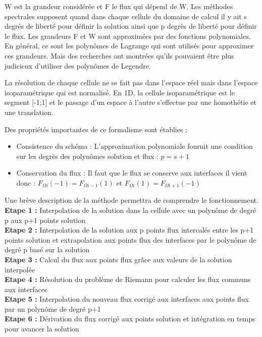 \documentclass[a4paper,12pt]{report}
\theoremstyle{break}
\begin{document}
W est la grandeur considérée et F le flux qui dépend de W. Les méthodes spectrales supposent quand dans chaque cellule du domaine de calcul il y ait s degrés de liberté pour définir la solution ainsi que p degrès de liberté pour définir le flux. Les grandeurs F et W sont approximées par des fonctions polynomiales. En général, ce sont les polynômes de Lagrange qui sont utilisés pour approximer ces grandeurs. Mais des recherches ont montrées qu'ils pouvaient être plus judicieux d'utiliser des polynômes de Legendre. 

La résolution de chaque cellule ne se fait pas dans l'espace réel mais dans l'espace isoparamétrique qui est normalisé. En 1D, la cellule isoparamétrique est le segment [-1;1] et le passage d'un espace à l'autre s'effectue par une homothétie et une translation. 

Des propriétés importantes de ce formalisme sont établies : 

\begin{itemize}[label=\textbullet]
   	    \item Consistence du schéma : L'approximation polynomiale fournit une condition sur les degrès des polynômes solution et flux : $ p=s+1 $
   	    \item Conservation du flux : Il faut que le flux se conserve aux interfaces il vient donc : $F_{\Omega i}(-1)=F_{\Omega i-1}(1)$ et $ F_{\Omega i}(1)=F_{\Omega i+1}(-1) $
        \end{itemize}
        
Une brève description de la méthode permettra de comprendre le fonctionnement. \\
\textbf{Etape 1 :} Interpolation de la solution dans la cellule avec un polynôme de degré p aux p+1 points solution\\
\textbf{Etape 2 :} Interpolation de la solution aux p points flux intercalés entre les p+1 points solution et extrapolation aux points flux des interfaces par le polynôme de degré p basé sur la solution\\
\textbf{Etape 3 :} Calcul du flux aux points flux grâce aux valeurs de la solution interpolée\\
\textbf{Etape 4 :} Résolution du problème de Riemann pour calculer les flux communs aux interfaces\\
\textbf{Etape 5 :} Interpolation du nouveau flux corrigé aux interfaces aux points flux par un polynôme de degré p+1\\
\textbf{Etape 6 :} Dérivation du flux corrigé aux points solution et intégration en temps pour avancer la solution
\end{document}
